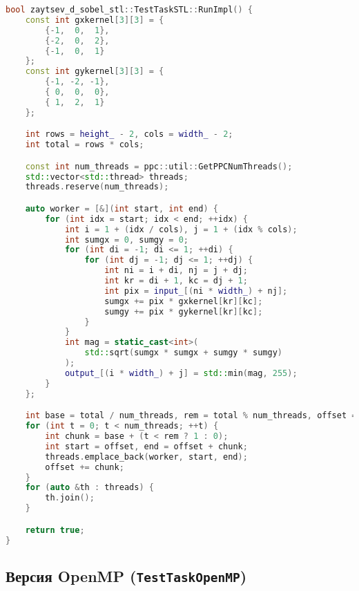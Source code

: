 \documentclass[12pt]{article}
\begin{document}
\begin{lstlisting}[language=C++, caption={Параллельная реализация с STL-потоками}]
bool zaytsev_d_sobel_stl::TestTaskSTL::RunImpl() {
    const int gxkernel[3][3] = {
        {-1,  0,  1},
        {-2,  0,  2},
        {-1,  0,  1}
    };
    const int gykernel[3][3] = {
        {-1, -2, -1},
        { 0,  0,  0},
        { 1,  2,  1}
    };

    int rows = height_ - 2, cols = width_ - 2;
    int total = rows * cols;

    const int num_threads = ppc::util::GetPPCNumThreads();
    std::vector<std::thread> threads;
    threads.reserve(num_threads);

    auto worker = [&](int start, int end) {
        for (int idx = start; idx < end; ++idx) {
            int i = 1 + (idx / cols), j = 1 + (idx % cols);
            int sumgx = 0, sumgy = 0;
            for (int di = -1; di <= 1; ++di) {
                for (int dj = -1; dj <= 1; ++dj) {
                    int ni = i + di, nj = j + dj;
                    int kr = di + 1, kc = dj + 1;
                    int pix = input_[(ni * width_) + nj];
                    sumgx += pix * gxkernel[kr][kc];
                    sumgy += pix * gykernel[kr][kc];
                }
            }
            int mag = static_cast<int>(
                std::sqrt(sumgx * sumgx + sumgy * sumgy)
            );
            output_[(i * width_) + j] = std::min(mag, 255);
        }
    };

    int base = total / num_threads, rem = total % num_threads, offset = 0;
    for (int t = 0; t < num_threads; ++t) {
        int chunk = base + (t < rem ? 1 : 0);
        int start = offset, end = offset + chunk;
        threads.emplace_back(worker, start, end);
        offset += chunk;
    }
    for (auto &th : threads) {
        th.join();
    }

    return true;
}
\end{lstlisting}

\subsection{Версия OpenMP (\texttt{TestTaskOpenMP})}
\end{document}
